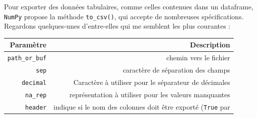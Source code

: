 \documentclass[12pt,]{book}
\numberwithin{equation}{section}
\numberwithin{countremarque}{section}
\begin{document}
Pour exporter des données tabulaires, comme celles contenues dans un
dataframe, \texttt{NumPy} propose la méthode \texttt{to\_csv()}, qui
accepte de nombreuses spécifications. Regardons quelques-unes
d'entre-elles qui me semblent les plus courantes :

\begin{longtable}[]{@{}rr@{}}
\toprule
\begin{minipage}[b]{0.22\columnwidth}\raggedleft\strut
Paramètre\strut
\end{minipage} & \begin{minipage}[b]{0.67\columnwidth}\raggedleft\strut
Description\strut
\end{minipage}\tabularnewline
\midrule
\endhead
\begin{minipage}[t]{0.22\columnwidth}\raggedleft\strut
\texttt{path\_or\_buf}\strut
\end{minipage} & \begin{minipage}[t]{0.67\columnwidth}\raggedleft\strut
chemin vers le fichier\strut
\end{minipage}\tabularnewline
\begin{minipage}[t]{0.22\columnwidth}\raggedleft\strut
\texttt{sep}\strut
\end{minipage} & \begin{minipage}[t]{0.67\columnwidth}\raggedleft\strut
caractère de séparation des champs\strut
\end{minipage}\tabularnewline
\begin{minipage}[t]{0.22\columnwidth}\raggedleft\strut
\texttt{decimal}\strut
\end{minipage} & \begin{minipage}[t]{0.67\columnwidth}\raggedleft\strut
Caractère à utiliser pour le séparateur de décimales\strut
\end{minipage}\tabularnewline
\begin{minipage}[t]{0.22\columnwidth}\raggedleft\strut
\texttt{na\_rep}\strut
\end{minipage} & \begin{minipage}[t]{0.67\columnwidth}\raggedleft\strut
représentation à utiliser pour les valeurs manquantes\strut
\end{minipage}\tabularnewline
\begin{minipage}[t]{0.22\columnwidth}\raggedleft\strut
\texttt{header}\strut
\end{minipage} & \begin{minipage}[t]{0.67\columnwidth}\raggedleft\strut
indique si le nom des colonnes doit être exporté (\texttt{True} par

\end{minipage}
\end{longtable}
\end{document}

